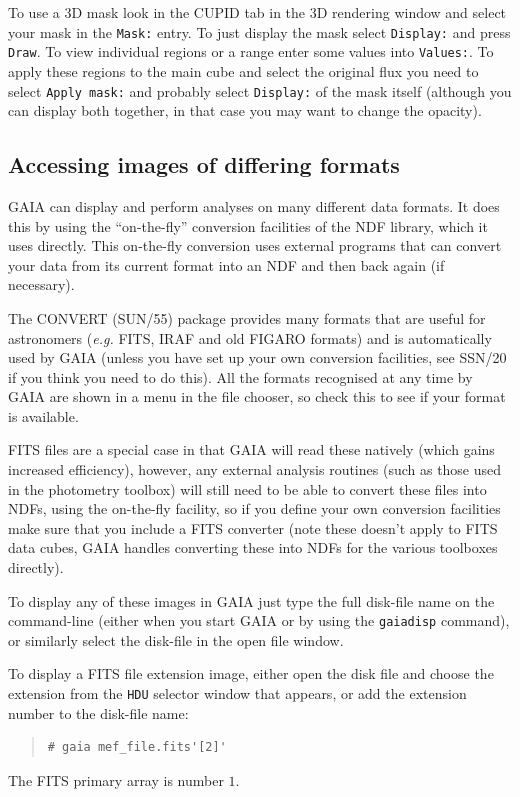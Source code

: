 \documentclass[twoside,11pt]{article}
\newcommand{\xref}[3]{#1}
\newcommand{\xlabel}[1]{}
\renewcommand{\_}{\texttt{\symbol{95}}}
\newcommand{\mytt}[1]{{\texttt{#1}}}
\begin{document}
To use a 3D mask look in the CUPID tab in the 3D rendering window and select
your mask in the \mytt{Mask:} entry. To just display the mask select
\mytt{Display:} and press \mytt{Draw}. To view individual regions or a
range enter some values into \mytt{Values:}. To apply these regions to the
main cube and select the original flux you need to select \mytt{Apply mask:}
and probably select \mytt{Display:} of the mask itself (although you can
display both together, in that case you may want to change the opacity).

\subsection{\xlabel{image_formats}Accessing images of differing formats}

GAIA can display and perform analyses on many different data
formats. It does this by using the ``on-the-fly'' conversion
facilities of the NDF library, which it uses directly. This on-the-fly
conversion uses external programs that can convert your data from its
current format into an NDF and then back again (if necessary).

The CONVERT \xref{(SUN/55)}{sun55}{} package provides many formats
that are useful for astronomers (\textit{e.g.} FITS, IRAF and old FIGARO
formats) and is automatically used by GAIA (unless you have set up
your own conversion facilities, see \xref{SSN/20}{ssn20}{} if you
think you need to do this). All the formats recognised at any time by
GAIA are shown in a menu in the file chooser, so check this to see
if your format is available.

FITS files are a special case in that GAIA will read these natively
(which gains increased efficiency), however, any external analysis
routines (such as those used in the photometry toolbox) will still
need to be able to convert these files into NDFs, using the on-the-fly
facility, so if you define your own conversion facilities make sure
that you include a FITS converter (note these doesn't apply to FITS
data cubes, GAIA handles converting these into NDFs for the various
toolboxes directly).

To display any of these images in GAIA just type the full disk-file
name on the command-line (either when you start GAIA or by using the
\mytt{gaiadisp} command), or similarly select the disk-file in the
open file window.

To display a FITS file extension image, either open the disk file and
choose the extension from the \mytt{HDU} selector window that appears,
or add the extension number to the disk-file name:
\begin{quote}
\begin{verbatim}
# gaia mef_file.fits'[2]'
\end{verbatim}
\end{quote}
The FITS primary array is number $1$.
\end{document}
